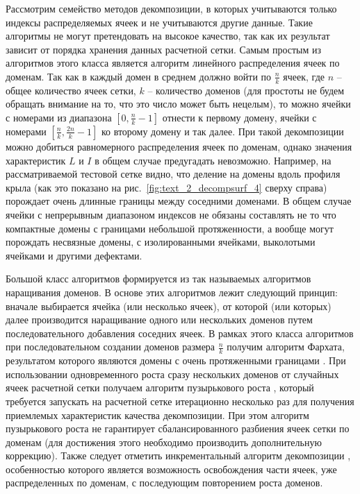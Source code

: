 Рассмотрим семейство методов декомпозиции, в которых учитываются только индексы распределяемых ячеек и не учитываются другие данные.
Такие алгоритмы не могут претендовать на высокое качество, так как их результат зависит от порядка хранения данных расчетной сетки.
Самым простым из алгоритмов этого класса является алгоритм линейного распределения ячеек по доменам.
Так как в каждый домен в среднем должно войти по $\frac{n}{k}$ ячеек, где $n$ -- общее количество ячеек сетки, $k$ -- количество доменов (для простоты не будем обращать внимание на то, что это число может быть нецелым), то можно ячейки с номерами из диапазона $[0, \frac{n}{k} - 1]$ отнести к первому домену, ячейки с номерами $[\frac{n}{k}, \frac{2n}{k} - 1]$ ко второму домену и так далее.
При такой декомпозиции можно добиться равномерного распределения ячеек по доменам, однако значения характеристик $L$ и $I$ в общем случае предугадать невозможно.
Например, на рассматриваемой тестовой сетке видно, что деление на домены вдоль профиля крыла (как это показано на рис.~\ref{fig:text_2_decompsurf_4} сверху справа) порождает очень длинные границы между соседними доменами.
В общем случае ячейки с непрерывным диапазоном индексов не обязаны составлять не то что компактные домены с границами небольшой протяженности, а вообще могут порождать несвязные домены, с изолированными ячейками, выколотыми ячейками и другими дефектами.

Большой класс алгоритмов формируется из так называемых алгоритмов наращивания доменов.
В основе этих алгоритмов лежит следующий принцип: вначале выбирается ячейка (или несколько ячеек), от которой (или которых) далее производится наращивание одного или нескольких доменов путем последовательного добавления соседних ячеек.
В рамках этого класса алгоритмов при последовательном создании доменов размера $\frac{n}{k}$ получим алгоритм Фархата, результатом которого являются домены с очень протяженными границами \cite{Farhat1988Decomp}.
При использовании одновременного роста сразу нескольких доменов от случайных ячеек расчетной сетки получаем алгоритм пузырькового роста \cite{Preis1997Decomp}, который требуется запускать на расчетной сетке итерационно несколько раз для получения приемлемых характеристик качества декомпозиции.
При этом алгоритм пузырькового роста не гарантирует сбалансированного разбиения ячеек сетки по доменам (для достижения этого необходимо производить дополнительную коррекцию).
Также следует отметить инкрементальный алгоритм декомпозиции \cite{Yakobovsky2005Decomp}, особенностью которого является возможность освобождения части ячеек, уже распределенных по доменам, с последующим повторением роста доменов.

